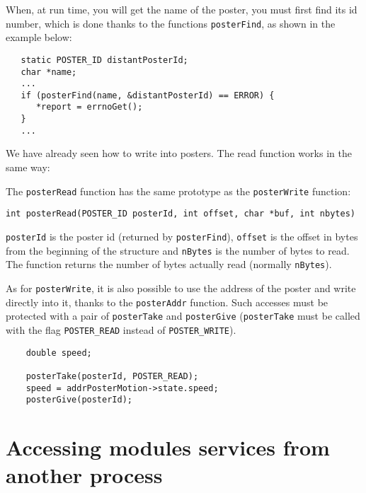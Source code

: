 When, at run time,  you will get the  name of the  poster, you must first
find  its id  number,  which   is done  thanks   to the   functions  
\texttt{posterFind}, as shown in the example below:

\begin{center}\begin{cartouche}\small\begin{verbatim}
   static POSTER_ID distantPosterId;
   char *name;
   ...
   if (posterFind(name, &distantPosterId) == ERROR) {
      *report = errnoGet();
   }
   ...
\end{verbatim}\end{cartouche}\end{center}

We have  already seen how to write  into posters. The read function works
in the same way:

The   \texttt{posterRead} function   has the  same    prototype as the 
\texttt{posterWrite} function:

\bigbreak
\texttt{int posterRead(POSTER\_ID posterId, int offset, char *buf, int nbytes)}
\bigbreak

\texttt{posterId} is  the poster id   (returned by \texttt{posterFind}),  
\texttt{offset} is the offset  in bytes from  the beginning of the structure  and
\texttt{nBytes} is the number  of bytes to read.   The function returns the
number of bytes actually read (normally \texttt{nBytes}).

As for \texttt{posterWrite},  it is also possible to  use the address of the
poster and   write  directly into  it,  thanks  to  the \texttt{posterAddr}
function. Such accesses must be protected with a pair of \texttt{posterTake}
and \texttt{posterGive} (\texttt{posterTake} must be  called with the flag 
\texttt{POSTER\_READ} instead of \texttt{POSTER\_WRITE}).

\begin{center}\begin{cartouche}\small\begin{verbatim}
    double speed;

    posterTake(posterId, POSTER_READ);
    speed = addrPosterMotion->state.speed;
    posterGive(posterId);
\end{verbatim}\end{cartouche}\end{center}



\section{Accessing modules services from another process}

